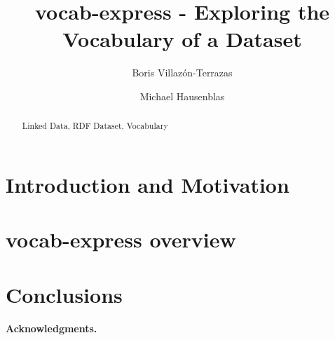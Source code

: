 \documentclass{llncs}
\newcommand{\keywords}[1]{\par\addvspace\baselineskip
\noindent\keywordname\enspace\ignorespaces#1}
\begin{document}

\title{vocab-express - Exploring the Vocabulary of a Dataset}


%
%
\author{Boris Villaz\'{o}n-Terrazas\and Michael Hausenblas}
%




%
%

\maketitle
\begin{abstract}

\keywords{Linked Data, RDF Dataset, Vocabulary} 
\end{abstract}

\section{Introduction and Motivation}\label{sec:introduction}


\section{vocab-express overview}\label{sec:vocab}


\section{Conclusions}\label{sec:conclusions}


 
\vspace{2mm}
\textbf{Acknowledgments.}

\vspace{-4mm}
 
 
\end{document}
